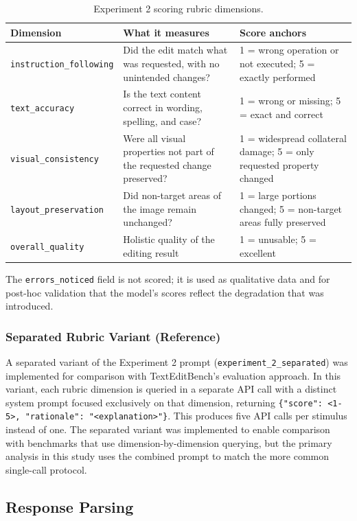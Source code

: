\begin{table}[htbp]
\centering
\caption{Experiment 2 scoring rubric dimensions.}
\label{tab:rubric}
\begin{tabular}{p{3.5cm}p{5.5cm}p{4cm}}
\toprule
Dimension & What it measures & Score anchors \\
\midrule
\texttt{instruction\_following} & Did the edit match what was requested, with no unintended changes? & 1 = wrong operation or not executed; 5 = exactly performed \\
\texttt{text\_accuracy} & Is the text content correct in wording, spelling, and case? & 1 = wrong or missing; 5 = exact and correct \\
\texttt{visual\_consistency} & Were all visual properties not part of the requested change preserved? & 1 = widespread collateral damage; 5 = only requested property changed \\
\texttt{layout\_preservation} & Did non-target areas of the image remain unchanged? & 1 = large portions changed; 5 = non-target areas fully preserved \\
\texttt{overall\_quality} & Holistic quality of the editing result & 1 = unusable; 5 = excellent \\
\bottomrule
\end{tabular}
\end{table}

The \texttt{errors\_noticed} field is not scored; it is used as qualitative data and for post-hoc validation that the model's scores reflect the degradation that was introduced.

\subsubsection{Separated Rubric Variant (Reference)}

A separated variant of the Experiment 2 prompt (\texttt{experiment\_2\_separated}) was implemented for comparison with TextEditBench's evaluation approach. In this variant, each rubric dimension is queried in a separate API call with a distinct system prompt focused exclusively on that dimension, returning \verb|{"score": <1-5>, "rationale": "<explanation>"}|. This produces five API calls per stimulus instead of one. The separated variant was implemented to enable comparison with benchmarks that use dimension-by-dimension querying, but the primary analysis in this study uses the combined prompt to match the more common single-call protocol.

\subsection{Response Parsing} \label{Response Parsing}

